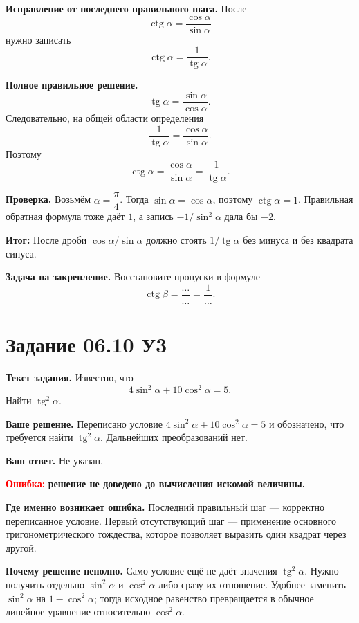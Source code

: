 \documentclass[12pt,a4paper]{article}
\newcommand{\errorlabel}[1]{\textcolor{red}{\textbf{Ошибка:}} \textbf{#1}}
\newcommand{\resultlabel}{\textcolor{teal!60!black}{\textbf{Итог:}}}
\begin{document}
\textbf{Исправление от последнего правильного шага.} После
\[
\operatorname{ctg}\alpha=\frac{\cos\alpha}{\sin\alpha}
\]
нужно записать
\[
\boxed{\operatorname{ctg}\alpha=\frac{1}{\operatorname{tg}\alpha}}.
\]

\textbf{Полное правильное решение.}
\[
\operatorname{tg}\alpha=\frac{\sin\alpha}{\cos\alpha}.
\]
Следовательно, на общей области определения
\[
\frac{1}{\operatorname{tg}\alpha}
=\frac{\cos\alpha}{\sin\alpha}.
\]
Поэтому
\[
\boxed{\operatorname{ctg}\alpha=\frac{\cos\alpha}{\sin\alpha}=\frac{1}{\operatorname{tg}\alpha}}.
\]

\textbf{Проверка.} Возьмём $\alpha=\dfrac{\pi}{4}$. Тогда $\sin\alpha=\cos\alpha$, поэтому $\operatorname{ctg}\alpha=1$. Правильная обратная формула тоже даёт $1$, а запись $-1/\sin^2\alpha$ дала бы $-2$.

\resultlabel{} После дроби $\cos\alpha/\sin\alpha$ должно стоять $1/\operatorname{tg}\alpha$ без минуса и без квадрата синуса.

\textbf{Задача на закрепление.} Восстановите пропуски в формуле
\[
\operatorname{ctg}\beta=\frac{\ldots}{\ldots}=\frac{1}{\ldots}.
\]

\newpage
{}\label{task:0610u3}
\section*{Задание 06.10 У3}

\textbf{Текст задания.} Известно, что
\[
4\sin^2\alpha+10\cos^2\alpha=5.
\]
Найти $\operatorname{tg}^2\alpha$.

\textbf{Ваше решение.} Переписано условие $4\sin^2\alpha+10\cos^2\alpha=5$ и обозначено, что требуется найти $\operatorname{tg}^2\alpha$. Дальнейших преобразований нет.

\textbf{Ваш ответ.} Не указан.

\errorlabel{решение не доведено до вычисления искомой величины.}

\textbf{Где именно возникает ошибка.} Последний правильный шаг --- корректно переписанное условие. Первый отсутствующий шаг --- применение основного тригонометрического тождества, которое позволяет выразить один квадрат через другой.

\textbf{Почему решение неполно.} Само условие ещё не даёт значения $\operatorname{tg}^2\alpha$. Нужно получить отдельно $\sin^2\alpha$ и $\cos^2\alpha$ либо сразу их отношение. Удобнее заменить $\sin^2\alpha$ на $1-\cos^2\alpha$; тогда исходное равенство превращается в обычное линейное уравнение относительно $\cos^2\alpha$.
\end{document}

